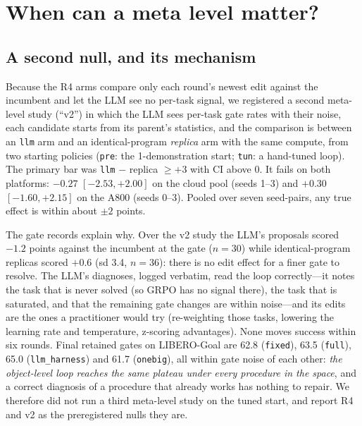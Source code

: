 \section{When can a meta level matter?}
\label{sec:meta}

\subsection{A second null, and its mechanism}
Because the R4 arms compare only each round's newest edit against the incumbent and let the LLM see no per-task signal, we registered a second meta-level study (``v2'') in which the LLM sees per-task gate rates with their noise, each candidate starts from its parent's statistics, and the comparison is between an \texttt{llm} arm and an identical-program \emph{replica} arm with the same compute, from two starting policies (\texttt{pre}: the 1-demonstration start; \texttt{tun}: a hand-tuned loop). The primary bar was \texttt{llm} $-$ replica $\geq +3$ with CI above 0. It fails on both platforms: $-0.27$ $[-2.53, +2.00]$ on the cloud pool (seeds 1--3) and $+0.30$ $[-1.60, +2.15]$ on the A800 (seeds 0--3). Pooled over seven seed-pairs, any true effect is within about $\pm 2$ points.

The gate records explain why. Over the v2 study the LLM's proposals scored $-1.2$ points against the incumbent at the gate ($n{=}30$) while identical-program replicas scored $+0.6$ (sd 3.4, $n{=}36$): there is no edit effect for a finer gate to resolve. The LLM's diagnoses, logged verbatim, read the loop correctly---it notes the task that is never solved (so GRPO has no signal there), the task that is saturated, and that the remaining gate changes are within noise---and its edits are the ones a practitioner would try (re-weighting those tasks, lowering the learning rate and temperature, z-scoring advantages). None moves success within six rounds. Final retained gates on LIBERO-Goal are 62.8 (\texttt{fixed}), 63.5 (\texttt{full}), 65.0 (\texttt{llm\_harness}) and 61.7 (\texttt{onebig}), all within gate noise of each other: \emph{the object-level loop reaches the same plateau under every procedure in the space}, and a correct diagnosis of a procedure that already works has nothing to repair. We therefore did not run a third meta-level study on the tuned start, and report R4 and v2 as the preregistered nulls they are.

